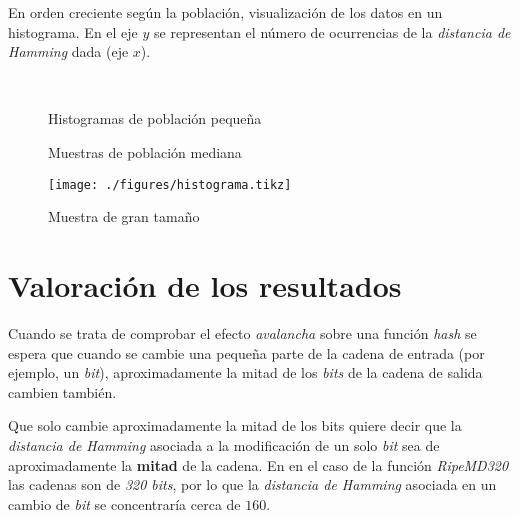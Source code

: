 \documentclass[11pt,a4paper]{article}
\begin{document}
En orden creciente según la población, visualización de los datos en
un histograma. En el eje $y$ se representan el número de ocurrencias
de la \emph{distancia de Hamming} dada (eje $x$).

\begin{figure}[h]
  \centering
  \vspace{-10pt}
  \\
  \vspace{-10pt}
  \caption{Histogramas de población pequeña}
  \vspace{-10pt}
  \label{fig:small}
\end{figure}

\begin{figure}
  \centering
  \caption{Muestras de población mediana}
  \label{fig:med}
\end{figure}

\begin{figure}
  \centering
  \vspace{-30pt}
  \texttt{[image: ./figures/histograma.tikz]}
  \caption{Muestra de gran tamaño}
  \vspace{-10pt}
  \label{fig:big}
\end{figure}

\section{Valoración de los resultados}

Cuando se trata de comprobar el efecto \emph{avalancha} sobre una
función \emph{hash} se espera que cuando se cambie una pequeña parte
de la cadena de entrada (por ejemplo, un \emph{bit}), aproximadamente
la mitad de los \emph{bits} de la cadena de salida cambien también.

Que solo cambie aproximadamente la mitad de los bits quiere decir que
la \emph{distancia de Hamming} asociada a la modificación de un solo
\emph{bit} sea de aproximadamente la \textbf{mitad} de la cadena. En
en el caso de la función \emph{RipeMD320} las cadenas son de \emph{320
  bits}, por lo que la \emph{distancia de Hamming} asociada en un
cambio de \emph{bit} se concentraría cerca de $160$.
\end{document}
